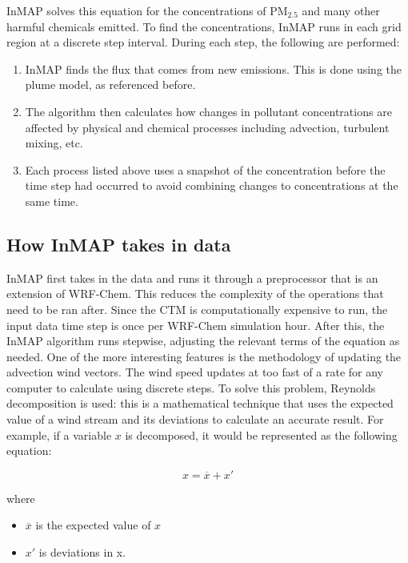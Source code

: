 \documentclass{article}
\begin{document}
InMAP solves this equation for the concentrations of $\text{PM}_{2.5}$ and many other harmful chemicals emitted. To find the concentrations,
InMAP runs in each grid region at a discrete step interval. During each step, the following are performed: 

\begin{enumerate}
    \item InMAP finds the flux that comes from new emissions. This is done using the plume model, as referenced before. 
    \item The algorithm then calculates how changes in pollutant concentrations are affected by physical and chemical processes including advection, turbulent mixing, etc.
    \item Each process listed above uses a snapshot of the concentration before the time step had occurred to avoid combining changes to concentrations at the same time. 
  \end{enumerate} 

\subsection{How InMAP takes in data}

InMAP first takes in the data and runs it through a preprocessor that is an extension of WRF-Chem. This reduces the complexity of the operations
that need to be ran after. Since the CTM is computationally expensive to run, the input data time step is once per WRF-Chem simulation hour. 
After this, the InMAP algorithm runs stepwise, adjusting the relevant terms of the equation as needed. One of the more interesting features is the 
methodology of updating the advection wind vectors. The wind speed updates at too fast of a rate for any computer to calculate using discrete steps.
To solve this problem, Reynolds decomposition is used: this is a mathematical technique that uses the expected value
of a wind stream and its deviations to calculate an accurate result. For example, if a variable $x$ is decomposed, it would be 
represented as the following equation: 

\begin{equation}
    x = \overline{x} + x'
\end{equation}

where

\begin{itemize}
    \item $\overline{x}$ is the expected value of $x$
    \item $x'$ is deviations in x.
\end{itemize}
\end{document}
